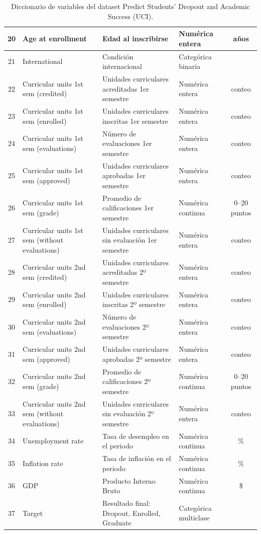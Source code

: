 \documentclass[10pt]{article}
\begin{document}
\begin{table}[H]
\begin{tabular}{|c|p{5cm}|p{6.2cm}|p{3.2cm}|c|}
20 & Age at enrollment & Edad al inscribirse & Numérica entera & años \\ \hline
21 & International & Condición internacional & Categórica binaria &  \\ \hline
22 & Curricular units 1st sem (credited) & Unidades curriculares acreditadas 1er semestre & Numérica entera & conteo \\ \hline
23 & Curricular units 1st sem (enrolled) & Unidades curriculares inscritas 1er semestre & Numérica entera & conteo \\ \hline
24 & Curricular units 1st sem (evaluations) & Número de evaluaciones 1er semestre & Numérica entera & conteo \\ \hline
25 & Curricular units 1st sem (approved) & Unidades curriculares aprobadas 1er semestre & Numérica entera & conteo \\ \hline
26 & Curricular units 1st sem (grade) & Promedio de calificaciones 1er semestre & Numérica continua & 0–20 puntos \\ \hline
27 & Curricular units 1st sem (without evaluations) & Unidades curriculares sin evaluación 1er semestre & Numérica entera & conteo \\ \hline
28 & Curricular units 2nd sem (credited) & Unidades curriculares acreditadas 2º semestre & Numérica entera & conteo \\ \hline
29 & Curricular units 2nd sem (enrolled) & Unidades curriculares inscritas 2º semestre & Numérica entera & conteo \\ \hline
30 & Curricular units 2nd sem (evaluations) & Número de evaluaciones 2º semestre & Numérica entera & conteo \\ \hline
31 & Curricular units 2nd sem (approved) & Unidades curriculares aprobadas 2º semestre & Numérica entera & conteo \\ \hline
32 & Curricular units 2nd sem (grade) & Promedio de calificaciones 2º semestre & Numérica continua & 0–20 puntos \\ \hline
33 & Curricular units 2nd sem (without evaluations) & Unidades curriculares sin evaluación 2º semestre & Numérica entera & conteo \\ \hline
34 & Unemployment rate & Tasa de desempleo en el periodo & Numérica continua & \% \\ \hline
35 & Inflation rate & Tasa de inflación en el periodo & Numérica continua & \% \\ \hline
36 & GDP & Producto Interno Bruto & Numérica continua & \$ \\ \hline
37 & Target & Resultado final: Dropout, Enrolled, Graduate & Categórica multiclase &  \\ \hline
\end{tabular}
\caption{Diccionario de variables del dataset Predict Students' Dropout and Academic Success (UCI).}

\end{table}
	
\end{document}
